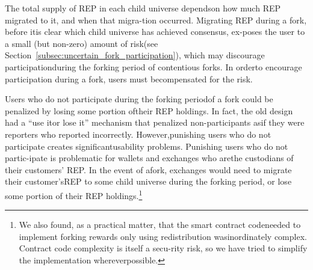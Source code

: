 \documentclass[12pt,floatfix,reprint,nofootinbib,amsmath,amssymb,epsfig,pre,floats,letterpaper,groupedaffiliation]{revtex4-1}
\theoremstyle{definition}
\theoremstyle{definition}
\begin{document}
The total supply of REP in each child universe depends\linebreak on how much REP migrated to it, and when that migra-\linebreak tion occurred. Migrating REP during a fork, before it\linebreak is clear which child universe has achieved consensus, ex-\linebreak poses the user to a small (but non-zero) amount of risk\linebreak (see Section~\ref{subsec:uncertain_fork_participation}), which may discourage participation\linebreak during the forking period of contentious forks. In order\linebreak to encourage participation during a fork, users must be\linebreak compensated for the risk.

Users who do not participate during the forking period\linebreak of a fork could be penalized by losing some portion of\linebreak their REP holdings. In fact, the old design had a ``use it\linebreak or lose it'' mechanism that penalized non-participants as\linebreak if they were reporters who reported incorrectly. However,\linebreak punishing users who do not participate creates significant\linebreak usability problems. Punishing users who do not partic-\linebreak ipate is problematic for wallets and exchanges who are\linebreak the custodians of their customers' REP. In the event of a\linebreak fork, exchanges would need to migrate their customer's\linebreak \enlargethispage*{1\baselineskip}REP to some child universe during the forking period, or \linebreak lose some portion of their REP holdings.\footnote{We also found, as a practical matter, that the smart contract code\linebreak needed to implement forking rewards only using redistribution was\linebreak inordinately complex. Contract code complexity is itself a secu-\linebreak rity risk, so we have tried to simplify the implementation wherever\linebreak possible.}
\end{document}
